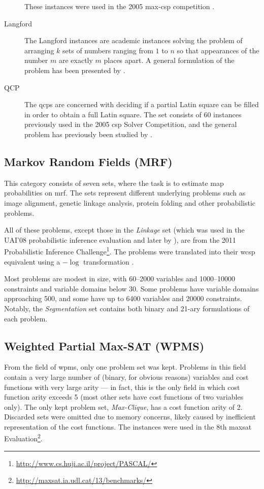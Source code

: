 \begin{description}
		These instances were used in the 2005 max-\gls{csp} competition \parencite{Boussemart05}.
	\item[Langford]
		The Langford instances are academic instances solving the problem of arranging \(k\) sets of numbers ranging from \(1\) to \(n\) so that appearances of the number \(m\) are exactly \(m\) places apart.
		A general formulation of the problem has been presented by \textcite{Linek03}.
	\item[QCP]
		The \glspl{qcp} are concerned with deciding if a partial Latin square can be filled in order to obtain a full Latin square.
		The set consists of 60 instances previously used in the 2005 \gls{csp} Solver Competition, and the general problem has previously been studied by \textcite{Gomes02}.
\end{description}

\subsection{Markov Random Fields (MRF)}
This category consists of seven sets, where the task is to estimate \gls{map} probabilities on \gls{mrf}. The sets represent different underlying problems such as image alignment, genetic linkage analysis, protein folding and other probabilistic problems.

All of these problems, except those in the \emph{Linkage} set (which was used in the UAI'08 probabilistic inference evaluation and later by \textcites{Favier11}{Kishimoto13}), are from the 2011 Probabilistic Inference Challenge\footnote{\url{http://www.cs.huji.ac.il/project/PASCAL/}}.
The problems were translated into their \gls{wcsp} equivalent using a \(-\log{}\) transformation \parencite[\pno~4]{deGivry14}.

Most problems are modest in size, with \numrange{60}{2000} variables and \numrange{1000}{10000} constraints and variable domains below \num{30}.
Some problems have variable domains approaching \num{500}, and some have up to \num{6400} variables and \num{20000} constraints.
Notably, the \emph{Segmentation} set contains both binary and 21-ary formulations of each problem.

\subsection{Weighted Partial Max-SAT (WPMS)}
From the field of \gls{wpms}, only one problem set was kept.
Problems in this field contain a very large number of (binary, for obvious reasons) variables and cost functions with very large arity --- in fact, this is the only field in which cost function arity exceeds \num{5} (most other sets have cost functions of two variables only).
The only kept problem set, \emph{Max-Clique}, has a cost function arity of \num{2}.
Discarded sets were omitted due to memory concerns, likely caused by inefficient representation of the cost functions.
The instances were used in the 8th \Gls{maxsat} Evaluation\footnote{\url{http://maxsat.ia.udl.cat/13/benchmarks/}}.

